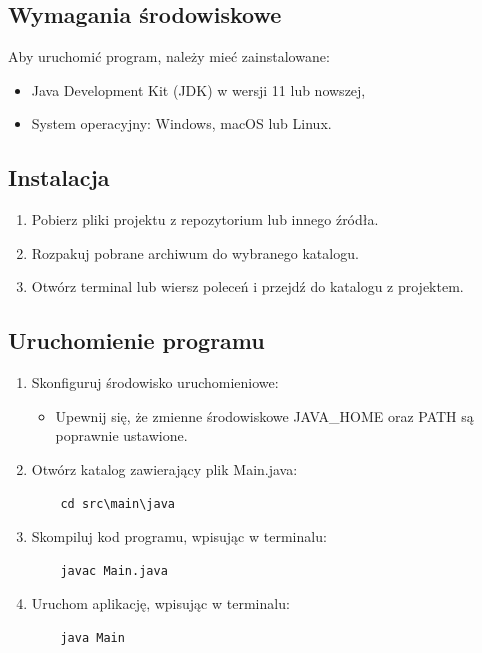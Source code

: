 \documentclass{article}
\begin{document}
\subsection{Wymagania środowiskowe}
Aby uruchomić program, należy mieć zainstalowane:
\begin{itemize}
    \item Java Development Kit (JDK) w wersji 11 lub nowszej,
    \item System operacyjny: Windows, macOS lub Linux.
\end{itemize}

\subsection{Instalacja}
\begin{enumerate}
    \item Pobierz pliki projektu z repozytorium lub innego źródła.
    \item Rozpakuj pobrane archiwum do wybranego katalogu.
    \item Otwórz terminal lub wiersz poleceń i przejdź do katalogu z projektem.
\end{enumerate}

\subsection{Uruchomienie programu}
\begin{enumerate}
    \item Skonfiguruj środowisko uruchomieniowe:
       \begin{itemize}
           \item Upewnij się, że zmienne środowiskowe JAVA\_HOME oraz PATH są poprawnie ustawione.
       \end{itemize}
    \item Otwórz katalog zawierający plik Main.java:
    \begin{verbatim}
    cd src\main\java
    \end{verbatim}
    \item Skompiluj kod programu, wpisując w terminalu:
    \begin{verbatim}
    javac Main.java
    \end{verbatim}
    \item Uruchom aplikację, wpisując w terminalu:
    \begin{verbatim}
    java Main
    \end{verbatim}
\end{enumerate}
\end{document}
